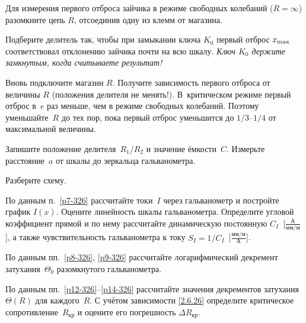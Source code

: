 \begin{lab:task}
	\item Для измерения первого отброса зайчика в режиме свободных колебаний
($R = \infty$) разомкните цепь $R$, отсоединив одну из клемм от магазина.

Подберите делитель так, чтобы при замыкании ключа
$K_0$ первый отброс $x_{\rm max}$ соответствовал отклонению
зайчика почти на всю шкалу.
\emph{Ключ $K_0$ держите замкнутым, когда считываете результат!}

	\item \label{p17-326} Вновь подключите магазин $R$. 
    Получите зависимость первого отброса от величины $R$
    (положения делителя не менять!). 
    В~критическом режиме первый отброс в~$e$ раз меньше, 
    чем в режиме свободных колебаний. Поэтому уменьшайте~$R$ до тех пор, 
    пока первый отброс уменьшится до $1/3$--$1/4$ от максимальной величины.

	\item Запишите положение делителя~$R_1/R_2$ и значение ёмкости~$C$. 
    Измерьте расстояние~$a$ от шкалы до зеркальца гальванометра.

	\item Разберите схему.


	\item По данным п.~\ref{p7-326} рассчитайте токи~$I$ через 
    гальванометр и постройте график $I(x)$. 
    Оцените линейность шкалы гальванометра. Определите угловой коэффициент прямой 
    и по нему рассчитайте динамическую постоянную $C_I$~[$\frac{А}{мм/м}$], 
    а также чувствительность гальванометра к току $S_I=1/C_I$~[$\frac{мм/м}{А}$].

	\item По данным пп.~\ref{p8-326}, \ref{p9-326} рассчитайте 
    логарифмический декремент затухания~$\Theta_0$ разомкнутого гальванометра.

\item По данным пп.~\ref{p12-326}--\ref{p14-326} 
рассчитайте значения декрементов затухания $\Theta(R)$ для каждого~$R$.
С учётом зависимости \eqref{2.6.26} определите критическое 
сопротивление~$R_{кр}$ и оцените его погрешность $\Delta R_{кр}$.


\end{lab:task}

